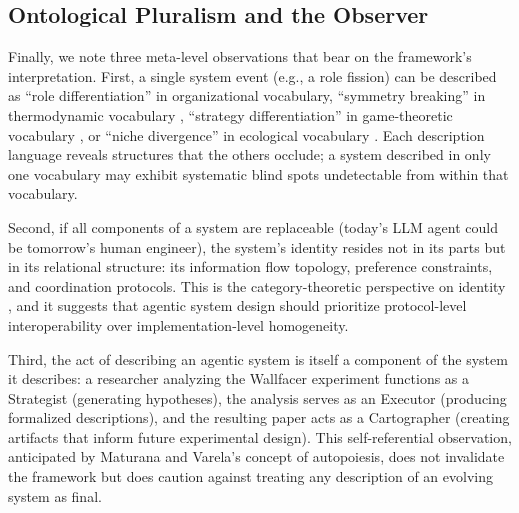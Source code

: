 \subsection{Ontological Pluralism and the Observer}

Finally, we note three meta-level observations that bear on the framework's interpretation. First, a single system event (e.g., a role fission) can be described as ``role differentiation'' in organizational vocabulary, ``symmetry breaking'' in thermodynamic vocabulary \cite{anderson1972}, ``strategy differentiation'' in game-theoretic vocabulary \cite{maynard-smith1982}, or ``niche divergence'' in ecological vocabulary \cite{hutchinson1957}. Each description language reveals structures that the others occlude; a system described in only one vocabulary may exhibit systematic blind spots undetectable from within that vocabulary.

Second, if all components of a system are replaceable (today's LLM agent could be tomorrow's human engineer), the system's identity resides not in its parts but in its relational structure: its information flow topology, preference constraints, and coordination protocols. This is the category-theoretic perspective on identity \cite{mac_lane1971}, and it suggests that agentic system design should prioritize protocol-level interoperability over implementation-level homogeneity.

Third, the act of describing an agentic system is itself a component of the system it describes: a researcher analyzing the Wallfacer experiment functions as a Strategist (generating hypotheses), the analysis serves as an Executor (producing formalized descriptions), and the resulting paper acts as a Cartographer (creating artifacts that inform future experimental design). This self-referential observation, anticipated by Maturana and Varela's \cite{maturana1980} concept of autopoiesis, does not invalidate the framework but does caution against treating any description of an evolving system as final.
